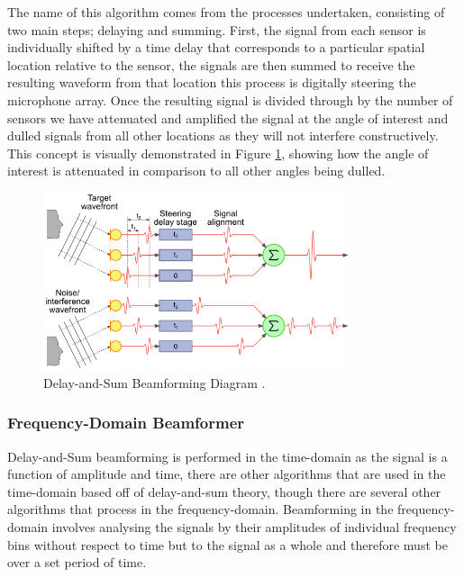 \documentclass{UoNMCHA}
\numberwithin{equation}{section}
\begin{document}
    The name of this algorithm comes from the processes undertaken, consisting of two main steps; delaying and summing. First, the signal from each sensor is individually shifted by a time delay that corresponds to a particular spatial location relative to the sensor, the signals are then summed to receive the resulting waveform from that location \citep{GreWeb} this process is digitally steering the microphone array. Once the resulting signal is divided through by the number of sensors we have attenuated and amplified the signal at the angle of interest and dulled signals from all other locations as they will not interfere constructively. This concept is visually demonstrated in Figure \ref{fig:das-diagram}, showing how the angle of interest is attenuated in comparison to all other angles being dulled.
    
    \begin{figure}[H]
        \centering
        \includegraphics[keepaspectratio, width = 0.8\textwidth]{Figures/DAS-Diagram.png}
        \caption{Delay-and-Sum Beamforming Diagram \citep{GreWeb}.}
        \label{fig:das-diagram}
    \end{figure}
\subsubsection{Frequency-Domain Beamformer} \label{sec:Freq-Domain Beamformer}
    Delay-and-Sum beamforming is performed in the time-domain as the signal is a function of amplitude and time, there are other algorithms that are used in the time-domain based off of delay-and-sum theory, though there are several other algorithms that process in the frequency-domain. Beamforming in the frequency-domain involves analysing the signals by their amplitudes of individual frequency bins without respect to time but to the signal as a whole and therefore must be over a set period of time. 
    
\end{document}
